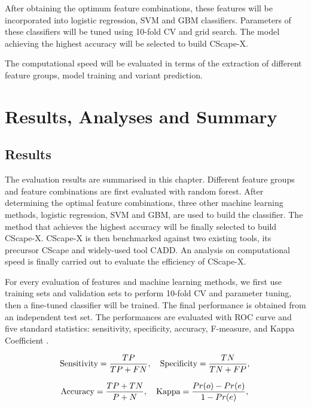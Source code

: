 \documentclass[a4paper,nohyper,nobib,openany,justified]{tufte-book}
\begin{document}
\begin{fullwidth}
After obtaining the optimum feature combinations, these features will be incorporated into logistic regression, SVM and GBM classifiers. Parameters of these classifiers will be tuned using 10-fold CV and grid search. The model achieving the highest accuracy will be selected to build CScape-X.

The computational speed will be evaluated in terms of the extraction of different feature groups, model training and variant prediction.

\part{Results, Analyses and Summary}

\chapter{Results}

The evaluation results are summarised in this chapter. Different feature groups and feature combinations are first evaluated with random forest. After determining the optimal feature combinations, three other machine learning methods, logistic regression, SVM and GBM, are used to build the classifier. The method that achieves the highest accuracy will be finally selected to build CScape-X. CScape-X is then benchmarked against two existing tools, its precursor CScape and widely-used tool CADD. An analysis on computational speed is finally carried out to evaluate the efficiency of CScape-X.

For every evaluation of features and machine learning methods, we first use training sets and validation sets to perform 10-fold CV and parameter tuning, then a fine-tuned classifier will be trained. The final performance is obtained from an independent test set. The performances are evaluated with ROC curve and five standard statistics: sensitivity, specificity, accuracy, F-measure, and Kappa Coefficient \cite{Cohen1960}.

\begin{equation}
    \text{Sensitivity} = \frac{TP}{TP+FN} , \quad
    \text{Specificity} = \frac{TN}{TN+FP} , \nonumber\\
\end{equation}

\begin{equation}
    \text{Accuracy} = \frac{TP+TN}{P+N} , \quad
    \text{Kappa} = \frac{Pr(o)-Pr(e)}{1-Pr(e)} , \nonumber\\
\end{equation}


\end{fullwidth}
\end{document}
